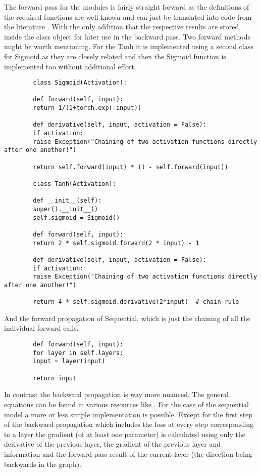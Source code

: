 \documentclass[11pt,english]{article}
\begin{document}
	The forward pass for the modules is fairly straight forward as the definitions of the required functions are well known and can just be translated into code from the literature \cite{Fleuret2022,Goodfellow-et-al-2016}. With the only addition that the respective results are stored inside the class object for later use in the backward pass. Two forward methods might be worth mentioning. For the Tanh it is implemented using a second class for Sigmoid as they are closely related and then the Sigmoid function is implemented too without additional effort.
	
	\begin{lstlisting}
		class Sigmoid(Activation):
		
		def forward(self, input):
		return 1/(1+torch.exp(-input))
		
		def derivative(self, input, activation = False):
		if activation:
		raise Exception("Chaining of two activation functions directly after one another!")
		
		return self.forward(input) * (1 - self.forward(input))
		
		class Tanh(Activation):
		
		def __init__(self):
		super().__init__()
		self.sigmoid = Sigmoid()
		
		def forward(self, input):
		return 2 * self.sigmoid.forward(2 * input) - 1
		
		def derivative(self, input, activation = False):
		if activation:
		raise Exception("Chaining of two activation functions directly after one another!")
		
		return 4 * self.sigmoid.derivative(2*input)  # chain rule  
	\end{lstlisting}
	
	And the forward propagation of Sequential, which is just the chaining of 
	all the individual forward calls.
	
	\begin{lstlisting}
		def forward(self, input):
		for layer in self.layers:
		input = layer(input)
		
		return input
	\end{lstlisting}

	In contrast the backward propagation is way more nuanced. The general equations can be found in various resources like \cite{Fleuret2022,Goodfellow-et-al-2016}. For the case of the sequential model a more or less simple implementation is possible. Except for the first step of the backward propagation which includes the loss at every step corresponding to a layer the gradient (of at least one parameter) is calculated using only the derivative of the previous layer, the gradient of the previous layer and information and the forward pass result of the current layer (the direction being backwards in the graph). 
	
\end{document}
